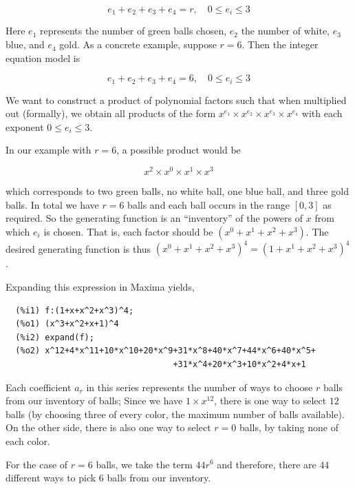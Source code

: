 \begin{equation*}
  e_1 + e_2 + e_3 + e_4 = r, \quad 0 \leq e_i \leq 3
\end{equation*}

Here $e_1$ represents the number of green balls chosen, $e_2$ the number of white, $e_3$ blue, and $e_4$ gold. As a concrete example, suppose $r = 6$. Then the integer equation model is

\begin{equation*}
  e_1 + e_2 + e_3 + e_4 = 6, \quad 0 \leq e_i \leq 3
\end{equation*}

We want to construct a product of polynomial factors such that when multiplied out (formally), we obtain all products of the form $x^{e_1} \times x^{e_2} \times x^{e_3} \times x^{e_4}$ with each exponent $0 \leq e_i \leq 3$.

In our example with $r=6$, a possible product would be

\begin{equation*}
  x^{2} \times x^{0} \times x^{1} \times x^{3}
\end{equation*}

which corresponds to two green balls, no white ball, one blue ball, and three gold balls. In total we have $r=6$ balls and each ball occurs in the range $[0,3]$ as required. So the generating function is an “inventory” of the powers of $x$ from which $e_i$ is chosen. That is, each factor should be $(x^0 + x^1 + x^2 + x^3)$. The desired generating function is thus $(x^0 + x^1 + x^2 + x^3)^4 = (1 + x^1 + x^2 + x^3)^4$.

Expanding this expression in Maxima yields,

\begin{verbatim}
  (%i1)	f:(1+x+x^2+x^3)^4;
  (%o1)	(x^3+x^2+x+1)^4
  (%i2)	expand(f);
  (%o2)	x^12+4*x^11+10*x^10+20*x^9+31*x^8+40*x^7+44*x^6+40*x^5+
                                  +31*x^4+20*x^3+10*x^2+4*x+1
\end{verbatim}

Each coefficient $a_r$ in this series represents the number of ways to choose $r$ balls from our inventory of balls; Since we have $1 \times x^{12}$, there is one way to select $12$ balls (by choosing three of every color, the maximum number of balls available). On the other side, there is also one way to select $r=0$ balls, by taking none of each color.

For the case of $r=6$ balls, we take the term $44 r^6$ and therefore, there are $44$ different ways to pick $6$ balls from our inventory.

